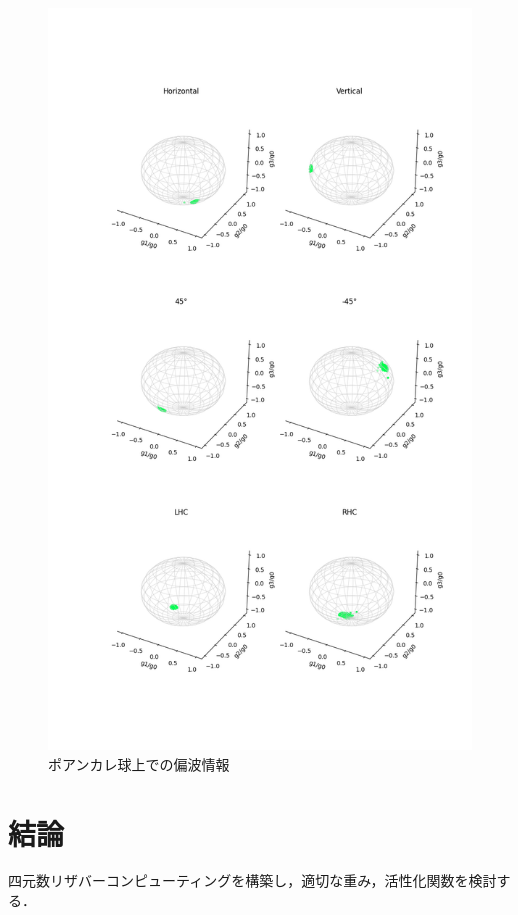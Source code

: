 \documentclass[uplatex,a4paper,12pt]{jsarticle}
\begin{document}
\begin{figure}[hbtp]
	\centering
	\includegraphics[scale=0.5]{../img/20220707_test_1_PS_2.png}
    \caption{ポアンカレ球上での偏波情報}
	\label{fig:ps}
\end{figure}


\section{結論}
四元数リザバーコンピューティングを構築し，適切な重み，活性化関数を検討する．
\end{document}

